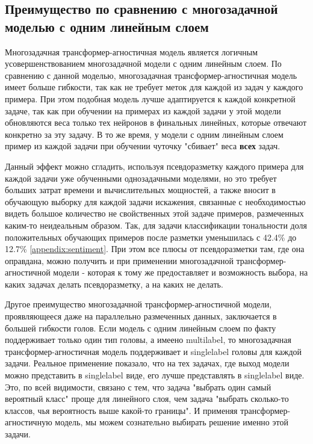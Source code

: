 \subsection{Преимущество по сравнению с многозадачной моделью с одним линейным слоем}\label{ch:tr-ag:advantages}

Многозадачная трансформер-агностичная модель является логичным усовершенствованием многозадачной модели с одним линейным слоем. По сравнению с данной моделью, многозадачная трансформер-агностичная модель имеет больше гибкости, так как не требует меток для каждой из задач у каждого примера. При этом подобная модель лучше адаптируется к каждой конкретной задаче, так как при обучении на примерах из каждой задачи у этой модели обновляются веса только тех нейронов в финальных линейных, которые отвечают конкретно за эту задачу. В то же время, у модели с одним линейным слоем пример из каждой задачи при обучении чуточку "сбивает" веса \textbf{всех} задач. 

Данный эффект можно сгладить, используя псевдоразметку каждого примера для каждой задачи уже обученными однозадачными моделями, но это требует больших затрат времени и вычислительных мощностей, а также вносит в обучающую выборку для каждой задачи искажения, связанные с необходимостью видеть большое количество не свойственных этой задаче примеров, размеченных каким-то неидеальным образом. Так, для задачи классификации тональности доля положительных обучающих примеров после разметки уменьшилась с 42.4\% до 12.7\% \ref{appendix:sentiment}. При этом все плюсы от псевдоразметки там, где она оправдана, можно получить и при применении многозадачной трансформер-агностичной модели - которая к тому же предоставляет и возможность выбора, на каких задачах делать псевдоразметку, а на каких не делать.

Другое преимущество многозадачной трансформер-агностичной модели, проявляющееся даже на параллельно размеченных данных, заключается в большей гибкости голов. Если модель с одним линейным слоем по факту поддерживает только один тип головы, а имеено multilabel, то многозадачная трансформер-агностичная модель поддерживает и singlelabel головы для каждой задачи. Реальное применение показало, что на тех задачах, где выход модели можно представить в singlelabel виде, его лучше представлять в singlelabel виде. Это, по всей видимости, связано с тем, что задача "выбрать один самый вероятный класс" проще для линейного слоя, чем задача "выбрать сколько-то классов, чья вероятность выше какой-то границы". И применяя трансформер-агностичную модель, мы можем сознательно выбирать решение именно этой задачи.


